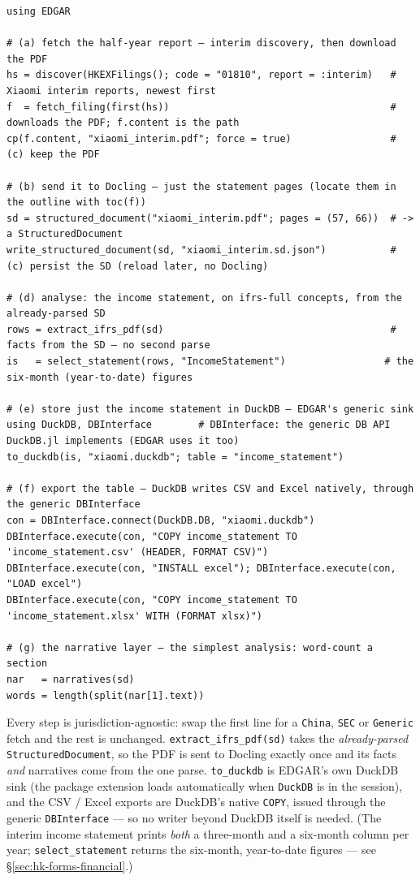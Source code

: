 \documentclass[11pt,a4paper]{report}
\begin{document}
\begin{lstlisting}
using EDGAR

# (a) fetch the half-year report — interim discovery, then download the PDF
hs = discover(HKEXFilings(); code = "01810", report = :interim)   # Xiaomi interim reports, newest first
f  = fetch_filing(first(hs))                                      # downloads the PDF; f.content is the path
cp(f.content, "xiaomi_interim.pdf"; force = true)                 # (c) keep the PDF

# (b) send it to Docling — just the statement pages (locate them in the outline with toc(f))
sd = structured_document("xiaomi_interim.pdf"; pages = (57, 66))  # -> a StructuredDocument
write_structured_document(sd, "xiaomi_interim.sd.json")           # (c) persist the SD (reload later, no Docling)

# (d) analyse: the income statement, on ifrs-full concepts, from the already-parsed SD
rows = extract_ifrs_pdf(sd)                                       # facts from the SD — no second parse
is   = select_statement(rows, "IncomeStatement")                 # the six-month (year-to-date) figures

# (e) store just the income statement in DuckDB — EDGAR's generic sink
using DuckDB, DBInterface        # DBInterface: the generic DB API DuckDB.jl implements (EDGAR uses it too)
to_duckdb(is, "xiaomi.duckdb"; table = "income_statement")

# (f) export the table — DuckDB writes CSV and Excel natively, through the generic DBInterface
con = DBInterface.connect(DuckDB.DB, "xiaomi.duckdb")
DBInterface.execute(con, "COPY income_statement TO 'income_statement.csv' (HEADER, FORMAT CSV)")
DBInterface.execute(con, "INSTALL excel"); DBInterface.execute(con, "LOAD excel")
DBInterface.execute(con, "COPY income_statement TO 'income_statement.xlsx' WITH (FORMAT xlsx)")

# (g) the narrative layer — the simplest analysis: word-count a section
nar   = narratives(sd)
words = length(split(nar[1].text))
\end{lstlisting}

\noindent Every step is jurisdiction-agnostic: swap the first line for a \texttt{China}, \texttt{SEC} or
\texttt{Generic} fetch and the rest is unchanged. \texttt{extract\_ifrs\_pdf(sd)} takes the \emph{already-parsed}
\texttt{StructuredDocument}, so the PDF is sent to Docling exactly once and its facts \emph{and} narratives come
from the one parse. \texttt{to\_duckdb} is EDGAR's own DuckDB sink (the package extension loads automatically
when \texttt{DuckDB} is in the session), and the CSV / Excel exports are DuckDB's native \texttt{COPY}, issued
through the generic \texttt{DBInterface} --- so no writer beyond DuckDB itself is needed. (The interim income
statement prints \emph{both} a three-month and a six-month column per year; \texttt{select\_statement} returns
the six-month, year-to-date figures --- see \S\ref{sec:hk-forms-financial}.)
\end{document}
